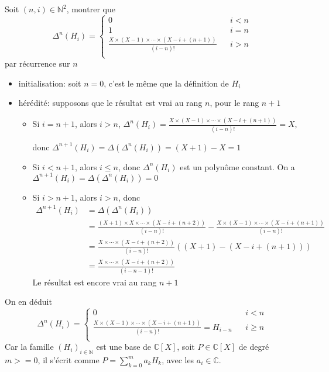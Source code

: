 \documentclass[a4paper,12pt]{book}
\begin{document}
\subsection{}
Soit $(n,i) \in \mathbb{N}^2$, montrer que 
\begin{equation}  \nonumber
    \Delta^n(H_i)=\left\{  
                 \begin{array}{rcl}  
                    0 & & i<n\\
                    1 & & i=n\\
                     \frac{X\times (X-1)\times \cdots \times (X-i+(n+1))}{(i-n)!} & & i>n\\
                 \end{array}  
    \right.  
\end{equation}
par récurrence sur $n$
\begin{itemize}
    \item initialisation: soit $n=0$, c'est le même que la définition de $H_i$
    \item hérédité: supposons que le résultat est vrai au rang $n$, pour le rang $n+1$
    \begin{itemize}
        \item Si $i=n+1$, alors $i>n$, $\Delta^n(H_i)=\frac{X\times (X-1)\times \cdots \times (X-i+(n+1))}{(i-n)!}=X$, 
        
        donc $\Delta^{n+1}(H_i)=\Delta(\Delta^n(H_i))=(X+1)-X=1$
        \item Si $i<n+1$, alors $i \leq n$, donc $\Delta^n(H_i)$ est un polynôme constant. On a $\Delta^{n+1}(H_i)=\Delta(\Delta^n(H_i))=0$
        
        \item Si $i>n+1$, alors $i >n$, donc 
        \begin{align*}
            \Delta^{n+1}(H_i)&=\Delta(\Delta^n(H_i))\\
            &=\frac{(X+1)\times X\times \cdots \times (X-i+(n+2))}{(i-n)!}-\frac{X\times (X-1)\times \cdots \times (X-i+(n+1))}{(i-n)!}\\
            &=\frac{X\times \cdots \times (X-i+(n+2))}{(i-n)!}((X+1)-(X-i+(n+1)))\\
            &=\frac{X\times \cdots \times (X-i+(n+2))}{(i-n-1)!}
        \end{align*}
        Le résultat est encore vrai au rang $n+1$
    \end{itemize}
\end{itemize}
On en déduit 
\begin{equation}  \nonumber
    \Delta^n(H_i)=\left\{  
                 \begin{array}{rcl}  
                    0 & & i<n\\
                     \frac{X\times (X-1)\times \cdots \times (X-i+(n+1))}{(i-n)!}=\boxed{H_{i-n}} & & i \geq n\\
                 \end{array}  
    \right.  
\end{equation}
Car la famille $(H_i)_{i \in \mathbb{N}}$ est une base de $\mathbb{C}[X]$, soit $P\in \mathbb{C}[X]$ de degré $m>=0$, 
il s'écrit comme $P=\sum_{k=0}^m a_kH_k$, avec les $a_i \in \mathbb{C}$. 
\end{document}
